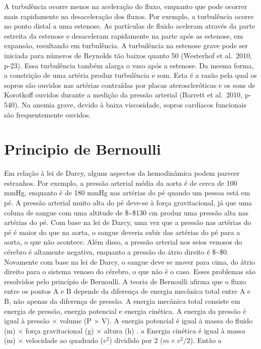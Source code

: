 \documentclass[
  portuguese,
  ]{book}
\begin{document}
A turbulência ocorre menos na aceleração do fluxo, enquanto que pode ocorrer mais rapidamente na desaceleração dos fluxos. Por exemplo, a turbulência ocorre no ponto distal a uma estenose. As partículas de fluido aceleram através da parte estreita da estenose e desaceleram rapidamente na parte após as estenose, em expansão, resultando em turbulência. A turbulência na estenose grave pode ser iniciada para números de Reynolds tão baixos quanto 50 (Westerhof et al.~2010, p-23). Essa turbulência também alarga o vaso após a estenose. Da mesma forma, a constrição de uma artéria produz turbulência e som. Esta é a razão pela qual os sopros são ouvidos nas artérias contraídas por placas ateroscleróticas e os sons de Korotkoff ouvidos durante a medição da pressão arterial (Barrett et al.~2010, p-540). Na anemia grave, devido à baixa viscosidade, sopros cardíacos funcionais são frequentemente ouvidos.

\hypertarget{principio-de-bernoulli}{%
\section{Principio de Bernoulli}\label{principio-de-bernoulli}}

Em relação à lei de Darcy, alguns aspectos da hemodinâmica podem parecer estranhos. Por exemplo, a pressão arterial média da aorta é de cerca de 100 mmHg, enquanto é de 180 mmHg nas artérias do pé quando um pessoa está em pé. A pressão arterial muito alta do pé deve-se à força gravitacional, já que uma coluna de sangue com uma altitude de \$\sim\$130 cm produz uma pressão alta nas artérias do pé. Com base na lei de Darcy, uma vez que a pressão nas artérias do pé é maior do que na aorta, o sangue deveria subir das artérias do pé para a aorta, o que não acontece. Além disso, a pressão arterial nos seios venosos do cérebro é altamente negativa, enquanto a pressão do átrio direito é \$\sim\$0. Novamente com base na lei de Darcy, o sangue deve se mover para cima, do átrio direito para o sistema venoso do cérebro, o que não é o caso. Esses problemas são resolvidos pelo princípio de Bernoulli. A teoria de Bernoulli afirma que o fluxo entre os pontos A e B depende da diferença de energia mecânica total entre A e B, não apenas da diferença de pressão. A energia mecânica total consiste em energia de pressão, energia potencial e energia cinética. A energia da pressão é igual à pressão \(\times\) volume (P \(\times\) V). A energia potencial é igual à massa do fluido (m) \(\times\) força gravitacional (g) \(\times\) altura (h) . a Energia cinética é igual à massa (m) \(\times\) velocidade ao quadrado (\(v^2\)) dividido por 2 (\(m\times v^2/2\)). Então a
\end{document}
